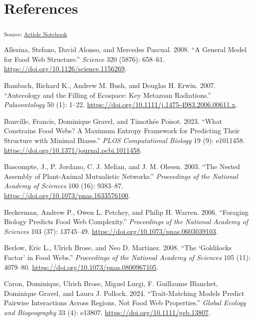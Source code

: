 \documentclass[
  letterpaper,
  DIV=11,
  numbers=noendperiod]{scrartcl}
\newlength{\cslhangindent}
\newenvironment{CSLReferences}[2] %
 {\begin{list}{}{%
  \setlength{\itemindent}{0pt}
  \setlength{\leftmargin}{0pt}
  \setlength{\parsep}{0pt}
  \ifodd #1
   \setlength{\leftmargin}{\cslhangindent}
   \setlength{\itemindent}{-1\cslhangindent}
  \fi
  \setlength{\itemsep}{#2\baselineskip}}}
 {\end{list}}
\begin{document}
\section*{References}\label{references}

\textsubscript{Source:
\href{https://BecksLab.github.io/ms_t_is_for_topology/index.qmd.html}{Article
Notebook}}

\label{refs}
\begin{CSLReferences}{1}{0}
Allesina, Stefano, David Alonso, and Mercedes Pascual. 2008. {``A
{General Model} for {Food Web Structure}.''} \emph{Science} 320 (5876):
658--61. \url{https://doi.org/10.1126/science.1156269}.

Bambach, Richard K., Andrew M. Bush, and Douglas H. Erwin. 2007.
{``Autecology and the {Filling} of {Ecospace}: {Key Metazoan
Radiations}.''} \emph{Palaeontology} 50 (1): 1--22.
\url{https://doi.org/10.1111/j.1475-4983.2006.00611.x}.

Banville, Francis, Dominique Gravel, and Timothée Poisot. 2023. {``What
Constrains Food Webs? {A} Maximum Entropy Framework for Predicting Their
Structure with Minimal Biases.''} \emph{PLOS Computational Biology} 19
(9): e1011458. \url{https://doi.org/10.1371/journal.pcbi.1011458}.

Bascompte, J., P. Jordano, C. J. Melian, and J. M. Olesen. 2003. {``The
Nested Assembly of Plant-Animal Mutualistic Networks.''}
\emph{Proceedings of the National Academy of Sciences} 100 (16):
9383--87. \url{https://doi.org/10.1073/pnas.1633576100}.

Beckerman, Andrew P., Owen L. Petchey, and Philip H. Warren. 2006.
{``Foraging Biology Predicts Food Web Complexity.''} \emph{Proceedings
of the National Academy of Sciences} 103 (37): 13745--49.
\url{https://doi.org/10.1073/pnas.0603039103}.

Berlow, Eric L., Ulrich Brose, and Neo D. Martinez. 2008. {``The
{`{Goldilocks} Factor'} in Food Webs.''} \emph{Proceedings of the
National Academy of Sciences} 105 (11): 4079--80.
\url{https://doi.org/10.1073/pnas.0800967105}.

Caron, Dominique, Ulrich Brose, Miguel Lurgi, F. Guillaume Blanchet,
Dominique Gravel, and Laura J. Pollock. 2024. {``Trait-Matching Models
Predict Pairwise Interactions Across Regions, Not Food Web
Properties.''} \emph{Global Ecology and Biogeography} 33 (4): e13807.
\url{https://doi.org/10.1111/geb.13807}.


\end{CSLReferences}
\end{document}
